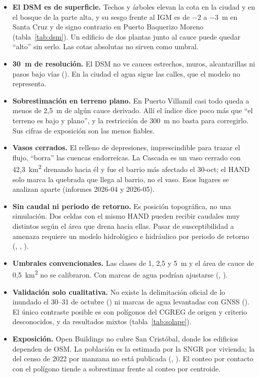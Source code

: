 \documentclass{sosg-informe}
\newcommand{\kmc}{km\textsuperscript{2}}
\begin{document}
\begin{itemize}
  \item \textbf{El DSM es de superficie.} Techos y árboles elevan la cota en la ciudad y en el bosque de la parte alta, y su sesgo frente al IGM es de $-2$ a $-3$~m en Santa Cruz y de signo contrario en Puerto Baquerizo Moreno (tabla~\ref{tab:dsm}). Un edificio de dos plantas junto al cauce puede quedar \enquote{alto} sin serlo. Las cotas absolutas no sirven como umbral.
  \item \textbf{30~m de resolución.} El DSM no ve cauces estrechos, muros, alcantarillas ni pasos bajo vías (). En la ciudad el agua sigue las calles, que el modelo no representa.
  \item \textbf{Sobrestimación en terreno plano.} En Puerto Villamil casi todo queda a menos de 2,5~m de algún cauce derivado. Allí el índice dice poco más que \enquote{el terreno es bajo y plano}, y la restricción de 300~m no basta para corregirlo. Sus cifras de exposición son las menos fiables.
  \item \textbf{Vasos cerrados.} El relleno de depresiones, imprescindible para trazar el flujo, \enquote{borra} las cuencas endorreicas. La Cascada es un vaso cerrado con 42,3~\kmc{} drenando hacia él y fue el barrio más afectado el 30-oct; el HAND solo marca la quebrada que llega al barrio, no el vaso. Esos lugares se analizan aparte (informes 2026-04 y 2026-05).
  \item \textbf{Sin caudal ni periodo de retorno.} Es posición topográfica, no una simulación. Dos celdas con el mismo HAND pueden recibir caudales muy distintos según el área que drena hacia ellas. Pasar de susceptibilidad a amenaza requiere un modelo hidrológico e hidráulico por periodo de retorno (, , ).
  \item \textbf{Umbrales convencionales.} Las clases de 1, 2,5 y 5~m y el área de cauce de 0,5~\kmc{} no se calibraron. Con marcas de agua podrían ajustarse (, ).
  \item \textbf{Validación solo cualitativa.} No existe la delimitación oficial de lo inundado el 30--31 de octubre () ni marcas de agua levantadas con GNSS (). El único contraste posible es con polígonos del CGREG de origen y criterio desconocidos, y da resultados mixtos (tabla~\ref{tab:solape}).
  \item \textbf{Exposición.} Open Buildings no cubre San Cristóbal, donde los edificios dependen de OSM. La población es la estimada por la SNGR por vivienda; la del censo de 2022 por manzana no está publicada (, ). El conteo por contacto con el polígono tiende a sobrestimar frente al conteo por centroide.
\end{itemize}
\end{document}
